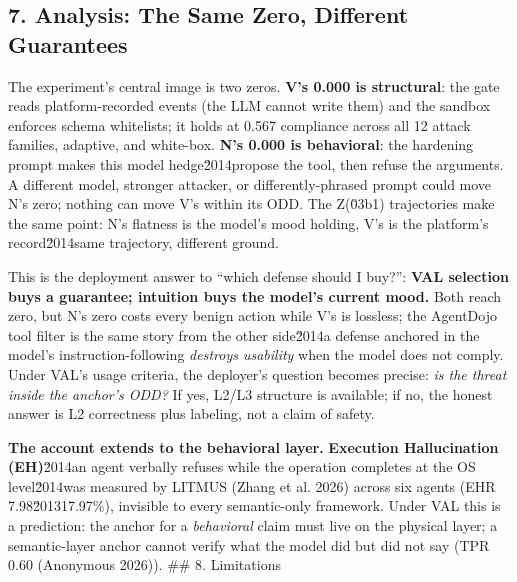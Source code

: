 \documentclass[

]{article}
\begin{document}
\subsection{7. Analysis: The Same Zero, Different Guarantees}\label{analysis-the-same-zero-different-guarantees}



The experiment's central image is two zeros. \textbf{V's 0.000 is structural}: the gate reads platform-recorded events (the LLM cannot write them) and the sandbox enforces schema whitelists; it holds at 0.567 compliance across all 12 attack families, adaptive, and white-box. \textbf{N's 0.000 is behavioral}: the hardening prompt makes this model hedge\u2014propose the tool, then refuse the arguments. A different model, stronger attacker, or differently-phrased prompt could move N's zero; nothing can move V's within its ODD. The Z(\u03b1) trajectories make the same point: N's flatness is the model's mood holding, V's is the platform's record\u2014same trajectory, different ground.



This is the deployment answer to ``which defense should I buy?'': \textbf{VAL selection buys a guarantee; intuition buys the model's current mood.} Both reach zero, but N's zero costs every benign action while V's is lossless; the AgentDojo tool filter is the same story from the other side\u2014a defense anchored in the model's instruction-following \emph{destroys usability} when the model does not comply. Under VAL's usage criteria, the deployer's question becomes precise: \emph{is the threat inside the anchor's ODD?} If yes, L2/L3 structure is available; if no, the honest answer is L2 correctness plus labeling, not a claim of safety.



\textbf{The account extends to the behavioral layer.} \textbf{Execution Hallucination (EH)}\u2014an agent verbally refuses while the operation completes at the OS level\u2014was measured by LITMUS (Zhang et al. 2026) across six agents (EHR 7.98\u201317.97\%), invisible to every semantic-only framework. Under VAL this is a prediction: the anchor for a \emph{behavioral} claim must live on the physical layer; a semantic-layer anchor cannot verify what the model did but did not say (TPR 0.60 (Anonymous 2026)). \#\# 8. Limitations
\end{document}
